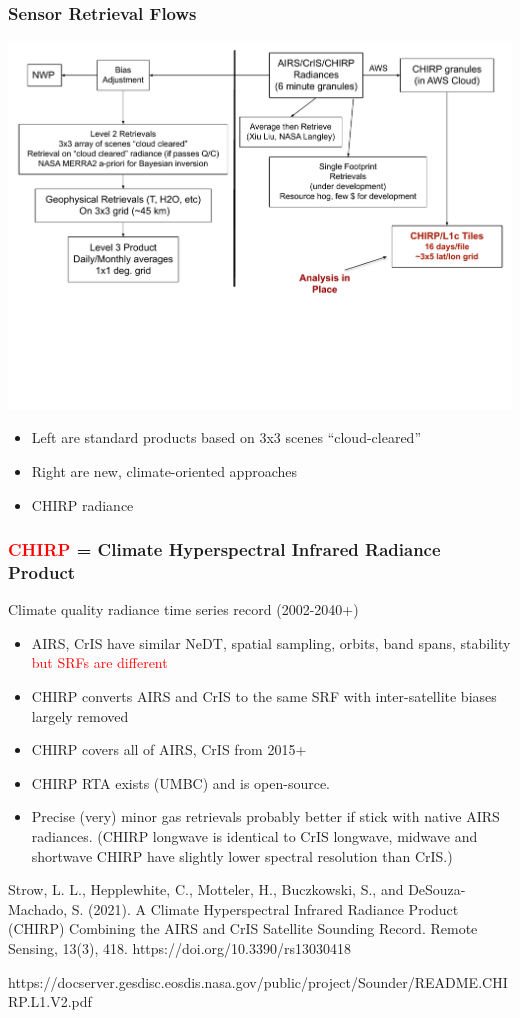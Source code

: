 \documentclass[10pt,t]{beamer}
\begin{document}
\begin{frame}
  \frametitle{Sensor Retrieval Flows}
  \includegraphics[width=\linewidth]{./airs_product_flow.pdf}
  \small
  \begin{itemize}
  \item Left are standard products based on 3x3 scenes ``cloud-cleared''
  \item Right are new, climate-oriented approaches
  \item CHIRP radiance
  \end{itemize}
\end{frame}
\begin{frame}
\frametitle{\textcolor{red}{CHIRP} = Climate Hyperspectral Infrared Radiance Product}
\small Climate quality radiance time series record (2002-2040+)

\begin{itemize}
  \item AIRS, CrIS have similar NeDT, spatial sampling, orbits, band spans, stability \textcolor{red}{but SRFs are different}
  \item CHIRP converts AIRS and CrIS to the same SRF with inter-satellite biases largely removed
  \item CHIRP covers all of AIRS, CrIS from 2015+
  \item CHIRP RTA exists (UMBC) and is open-source.  
  \item Precise (very) minor gas retrievals probably better if stick with native AIRS radiances.  (CHIRP longwave is identical to CrIS longwave, midwave and shortwave CHIRP have slightly lower spectral resolution than CrIS.)
\end{itemize}

\tiny Strow, L. L., Hepplewhite, C., Motteler, H., Buczkowski, S., and DeSouza-Machado, S. (2021). A
Climate Hyperspectral Infrared Radiance Product (CHIRP) Combining the AIRS and CrIS Satellite
Sounding Record. Remote Sensing, 13(3), 418. https://doi.org/10.3390/rs13030418

https://docserver.gesdisc.eosdis.nasa.gov/public/project/Sounder/README.CHIRP.L1.V2.pdf

\end{frame}
\end{document}
